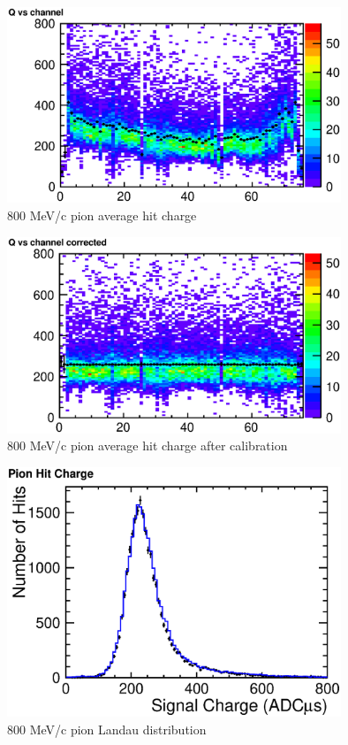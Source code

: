 \documentclass{cernyrep}
\begin{document}
\begin{figure}[htbp]
 \begin{center}
  \includegraphics[width=100mm]{PionQvsCh.eps}
 \end{center}
 \caption{800 MeV/c pion average hit charge}
 \label{fig:PionQvsCh}
\end{figure}

\begin{figure}[htbp]
 \begin{center}
  \includegraphics[width=100mm]{PionQcvsCh.eps}
 \end{center}
 \caption{800 MeV/c pion average hit charge after calibration}
 \label{fig:PionQcvsCh}
\end{figure}

\begin{figure}[htbp]
 \begin{center}
  \includegraphics[width=100mm]{PionLandau.eps}
 \end{center}
 \caption{800 MeV/c pion Landau distribution}
 \label{fig:PionLandau}
\end{figure}
\end{document}
